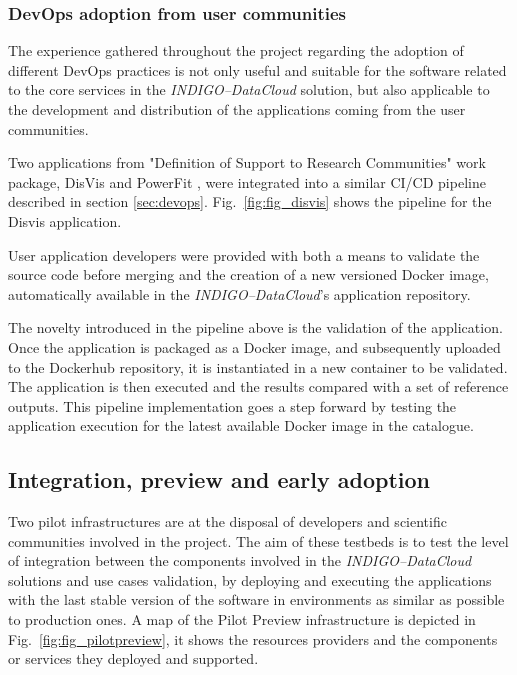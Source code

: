 \documentclass[journal]{IEEEtran}
\begin{document}
\subsubsection{DevOps adoption from user communities}

The experience gathered throughout the project regarding the adoption of
different DevOps practices is not only useful and suitable for the software related
to the core services in the {\sl INDIGO--DataCloud} solution, but also applicable to the
development and distribution of the applications coming from the user communities.

Two applications from "Definition of Support to Research Communities" work package,
DisVis \cite{disvis} and PowerFit \cite{powerfit}, were
integrated into a similar CI/CD pipeline described in section \ref{sec:devops}.
Fig.~\ref{fig:fig_disvis} shows the pipeline for the Disvis application.

User application developers were provided with both a means to validate the
source code before merging and the creation of a new versioned Docker image,
automatically available in the {\sl INDIGO--DataCloud}'s application repository.

The novelty introduced in the pipeline above is the validation of the application.
Once the application is packaged as a Docker image, and subsequently uploaded
to the Dockerhub repository, it is instantiated in a new container to be validated.
The application is then executed and the results compared with a set of reference outputs.
This pipeline implementation goes a step forward by testing the application
execution for the latest available Docker image in the catalogue.

\subsection{Integration, preview and early adoption}

Two pilot infrastructures are at the disposal of developers and scientific
communities involved in the project. The aim of these testbeds is to test the
level of integration between the components involved in the {\sl INDIGO--DataCloud}
solutions and use cases validation, by deploying and executing the applications
with the last stable version of the software in environments as similar as
possible to production ones. A map of the Pilot Preview
infrastructure is depicted in Fig.~\ref{fig:fig_pilotpreview}, it shows the
resources providers and the components or services they deployed and supported.
\end{document}

